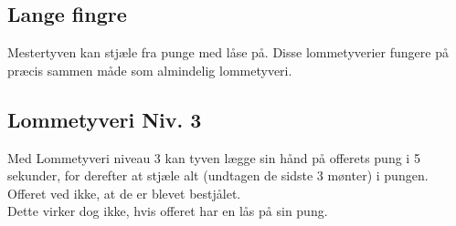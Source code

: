 \subsection{Lange fingre}
Mestertyven kan stjæle fra punge med låse på. Disse lommetyverier fungere på
præcis sammen måde som almindelig lommetyveri.\\

\subsection{Lommetyveri Niv. 3}
Med Lommetyveri niveau 3 kan tyven lægge sin hånd på offerets pung i 5 sekunder, for derefter at stjæle alt (undtagen de sidste 3 mønter) i pungen. Offeret ved ikke, at de er blevet bestjålet. \\
Dette virker dog ikke, hvis offeret har en lås på sin pung.\\